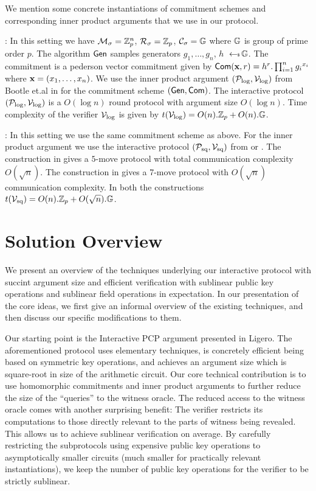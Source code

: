 We mention some concrete instantiations of commitment schemes and corresponding
inner product arguments that we use in our protocol.

: In this setting we have
$\mathcal{M}_\sigma=\mathbb{Z}^n_p$, $\mathcal{R}_\sigma=\mathbb{Z}_p$, $\mathcal{C}_\sigma=\mathbb{G}$ where $\mathbb{G}$
is group of prime order $p$. The algorithm $\mathsf{Gen}$ samples generators
$g_1,\ldots,g_n$, $h$ $\hskip2.3pt{\gets\!\!\mbox{\tiny${\$}$\normalsize}}\, \mathbb{G}$. The commitment is a pederson vector
commitment given by $\mathsf{Com}({\bf
x},r)=h^r.\prod_{i=1}^n {g_i}^{x_i}$ where ${\bf x}=(x_1,\ldots,x_n)$. We use
the inner product argument $(\mathcal{P}_\mathrm{log},\mathcal{V}_\mathrm{log})$ from Bootle et.al
in \cite{Bulletproofs} for the commitment scheme $(\mathsf{Gen},\mathsf{Com})$. The
interactive protocol $(\mathcal{P}_\mathrm{log},\mathcal{V}_\mathrm{log})$ is a $O(\log n)$ round protocol with
argument size $O(\log n)$. Time complexity of the verifier $\mathcal{V}_\mathrm{log}$ is given
by $t(\mathcal{V}_\mathrm{log})=O(n).\mathbb{Z}_p + O(n).\mathbb{G}$.\smallskip


: In this setting we use the
same commitment scheme as above. For the inner product argument we use the
interactive protocol $(\mathcal{P}_\mathrm{sq},\mathcal{V}_\mathrm{sq})$ from \cite{InnerProductDLS} or
\cite{Groth09b}. The construction in \cite{InnerProductDLS} gives a $5$-move
protocol with total communication complexity $O(\sqrt{n})$. The construction in
\cite{Groth09b} gives a 7-move protocol with $O(\sqrt{n})$ communication
complexity. In both the constructions $t(\mathcal{V}_\mathrm{sq}) = O(n).\mathbb{Z}_p +
O(\sqrt{n}).\mathbb{G}$.

\section{Solution Overview}
We present an overview of the techniques underlying our interactive protocol
with succint argument size and efficient verification with sublinear public
key operations and sublinear field operations in expectation. In our
presentation of the core ideas, we first give an informal overview of the
existing techniques, and then discuss our specific modifications to them.

Our starting point is the Interactive PCP argument presented in Ligero\cite{Ligero2017}. The
aforementioned protocol uses elementary techniques, is concretely
efficient being based on symmetric key operations, and achieves an argument
size which is square-root in size of the arithmetic circuit. Our core technical
contribution is to use homomorphic commitments and inner product arguments to 
further reduce the size of the ``queries'' to the witness oracle. The
reduced access to the witness oracle comes with another surprising benefit: The
verifier restricts its computations to those directly relevant to the parts of
witness being revealed. This allows us to achieve sublinear verification on
average. By carefully restricting the subprotocols using expensive public key
operations to asymptotically smaller circuits (much smaller for practically
relevant instantiations), we keep the number of public key operations for the
verifier to be strictly sublinear.
    
